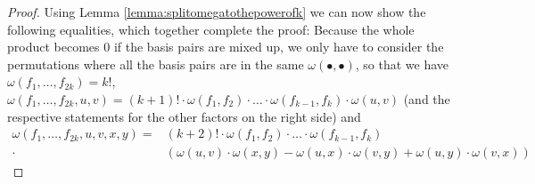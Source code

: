 \documentclass[../SymplecticSimplices.tex]{subfiles}
\begin{document}
\begin{proof}
  Using Lemma \ref{lemma:splitomegatothepowerofk} we can now show the following equalities, which together complete the proof: Because the whole product becomes \( 0 \) if the basis pairs are mixed up, we only have to consider the permutations where all the basis pairs are in the same \( \omega \left( \bullet, \bullet \right) \), so that we have \( \omega \left( f_1, \dots,  f_{2k} \right) = k! \),
  \( \omega \left( f_1, \dots, f_{2k}, u ,v \right) = (k+1)! \cdot \omega\left( f_1, f_2 \right) \cdot \dots \cdot \omega\left( f_{k-1}, f_k \right) \cdot \omega\left( u, v \right) \) (and the respective statements for the other factors on the right side) and
    \begin{align*}
      \omega \left( f_1, \dots, f_{2k}, u, v, x, y \right) = & (k+2)! \cdot \omega\left( f_1, f_2 \right) \cdot \dots \cdot \omega\left( f_{k-1}, f_k \right) \\ \cdot & \left( \omega\left( u, v \right) \cdot \omega\left( x, y \right) - \omega\left( u, x \right) \cdot \omega\left( v, y \right) +  \omega\left( u, y \right) \cdot \omega\left( v, x \right) \right)
    \end{align*}
\end{proof}
\end{document}
